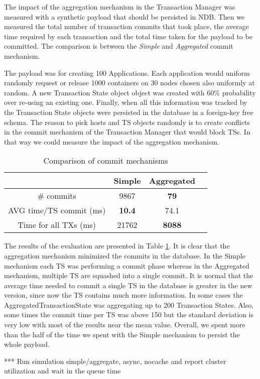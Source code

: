 The impact of the aggregation mechanism in the Transaction Manager was
measured with a synthetic payload that should be persisted in
NDB. Then we measured the total number of transaction commits that
took place, the average time required by each transaction and the
total time taken for the payload to be committed. The comparison is
between the \emph{Simple} and \emph{Aggregated} commit mechanism.

The payload was for creating 100 Applications. Each application would
uniform randomly request or release 1000 containers on 30 nodes
chosen also uniformly at random. A new Transaction State object object
was created with 60$\%$ probability over re-using an existing
one. Finally, when all this information was tracked by the Transaction
State objects were persisted in the database in a foreign-key free
schema. The reason to pick hosts
and TS objects randomly is to create conflicts in the commit mechanism
of the Transaction Manager that would block TSs. In that way we could
measure the impact of the aggregation mechanism.

\begin{table}
\centering
\begin{tabular}{| c | c | c | c |}
\hline
  & Simple & Aggregated \\
\hline
\# commits & 9867 & \textbf{79} \\
\hline
AVG time/TS commit (ms) & \textbf{10.4} & 74.1 \\
\hline
Time for all TXs (ms) & 21762 & \textbf{8088} \\
\hline
\end{tabular}
\caption{Comparison of commit mechanisms}
\label{tab:ev_commit_mechanism}
\end{table}

The results of the evaluation are presented in Table
\ref{tab:ev_commit_mechanism}. It is clear that the aggregation
mechanism minimized the commits in the database. In the Simple mechanism
each TS was performing a commit phase whereas in the Aggregated mechanism,
multiple TS are squashed into a single commit. It is normal that the
average time needed to commit a single TS in the database is greater
in the new version, since now the TS contains much more
information. In some cases the AggregatedTransactionState was
aggregating up to 200 Transaction States. Also, some times the commit
time per TS was above 150 but the standard deviation is very low with
most of the results near the mean value. Overall, we spent more
than the half of the time we spent with the Simple mechanism to persist
the whole payload.

*** Run simulation simple/aggregate, async, nocache and report cluster
utilization and wait in the queue time